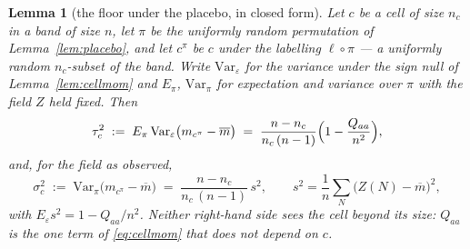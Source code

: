 \documentclass[11pt,a4paper]{article}
\theoremstyle{plain}
\newtheorem{lemma}[theorem]{Lemma}
\theoremstyle{definition}
\theoremstyle{remark}
\begin{document}
\begin{lemma}[the floor under the placebo, in closed form]%
\label{lem:permfloor}
Let $c$ be a cell of size $n_c$ in a band of size $n$, let $\pi$ be the
uniformly random permutation of Lemma~\ref{lem:placebo}, and let
$c^\pi$ be $c$ under the labelling $\ell\circ\pi$ --- a uniformly
random $n_c$-subset of the band. Write $\mathrm{Var}_\varepsilon$ for
the variance under the sign null of Lemma~\ref{lem:cellmom} and
$E_\pi$, $\mathrm{Var}_\pi$ for expectation and variance over $\pi$
with the field $Z$ held fixed. Then
\begin{equation}\label{eq:permfloor}
  \tau_c^2\;:=\;
  E_\pi\,\mathrm{Var}_\varepsilon\bigl(m_{c^\pi}-\overline m\bigr)
  \;=\;\frac{n-n_c}{n_c\,(n-1)}\Bigl(1-\frac{Q_{aa}}{n^2}\Bigr),
\end{equation}
and, for the field as observed,
\begin{equation}\label{eq:permnum}
  \sigma_c^2\;:=\;
  \mathrm{Var}_\pi\bigl(m_{c^\pi}-\overline m\bigr)
  \;=\;\frac{n-n_c}{n_c\,(n-1)}\,s^2,
  \qquad
  s^2=\frac1n\sum_N\bigl(Z(N)-\overline m\bigr)^2,
\end{equation}
with $E_\varepsilon s^2=1-Q_{aa}/n^2$. Neither right-hand side sees
the cell beyond its size: $Q_{aa}$ is the one term of
\eqref{eq:cellmom} that does not depend on $c$.
\end{lemma}
\end{document}
